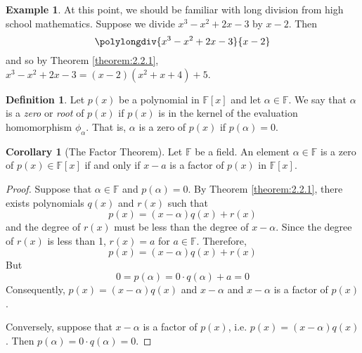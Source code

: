 \documentclass[11pt]{book}
\theoremstyle{definition}\newtheorem{definition}[subsection]{Definition}
\theoremstyle{definition}\newtheorem{example}[subsection]{Example}
\theoremstyle{definition}\newtheorem{notation}[subsection]{Notation}
\theoremstyle{definition}\newtheorem{remark}[subsection]{Remark}
\theoremstyle{theorem}\newtheorem{theorem}[subsection]{Theorem}
\theoremstyle{theorem}\newtheorem{lemma}[subsection]{Lemma}
\theoremstyle{theorem}\newtheorem{proposition}[subsection]{Proposition}
\theoremstyle{theorem}\newtheorem{corollary}[subsection]{Corollary}
\newcommand{\F}{\mathbb{F}}
\begin{document}
\begin{example}\label{example:2.2.2}
    At this point, we should be familiar with long division from high school mathematics. Suppose we divide $x^3 - x^2 +2x - 3$ by $x - 2$. Then
    \begin{equation*}
        \polylongdiv{x^3 - x^2 + 2x - 3}{x - 2}
    \end{equation*}
    and so by Theorem \ref{theorem:2.2.1}, $x^3 - x^2 + 2x - 3 = (x - 2)(x^2 + x + 4) + 5$.
\end{example}

\begin{definition}\label{definition:2.2.3}
    Let $p(x)$ be a polynomial in $\F[x]$ and let $\alpha \in \F$. We say that $\alpha$ is a \emph{zero} or \emph{root} of $p(x)$ if $p(x)$ is in the kernel of the evaluation homomorphism $\phi_{\alpha}$. That is, $\alpha$ is a zero of $p(x)$ if $p(\alpha) = 0$.
\end{definition}

\begin{corollary}[The Factor Theorem]\label{corollary:2.2.4}
    Let $\F$ be a field. An element $\alpha \in \F$ is a zero of $p(x) \in \F[x]$ if and only if $x - a$ is a factor of $p(x)$ in $\F[x]$.
\end{corollary}

\begin{proof}
    Suppose that $\alpha \in \F$ and $p(\alpha) = 0$. By Theorem \ref{theorem:2.2.1}, there exists polynomials $q(x)$ and $r(x)$ such that
    \begin{equation*}
        p(x) = (x - \alpha)q(x) + r(x)
    \end{equation*}
    and the degree of $r(x)$ must be less than the degree of $x - \alpha$. Since the degree of $r(x)$ is less than 1, $r(x) = a$ for $a \in \F$. Therefore,
    \begin{equation*}
        p(x) = (x - \alpha)q(x) + r(x)
    \end{equation*}
    But
    \begin{equation*}
        0 = p(\alpha) = 0 \cdot q(\alpha) + a = 0
    \end{equation*}
    Consequently, $p(x) = (x - \alpha)q(x)$ and $x - \alpha$ and $x - \alpha$ is a factor of $p(x)$.

    Conversely, suppose that $x - \alpha$ is a factor of $p(x)$, i.e. $p(x) = (x - \alpha)q(x)$. Then $p(\alpha) = 0 \cdot q(\alpha) = 0$.
\end{proof}
\end{document}
